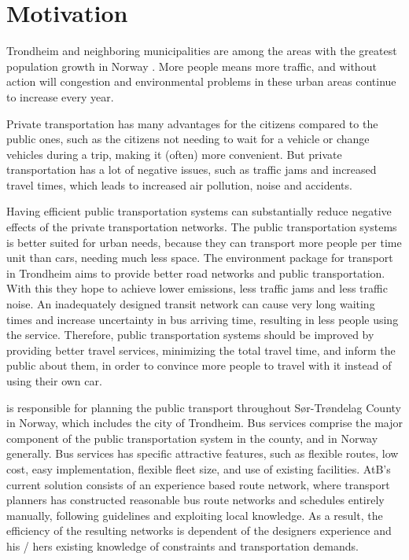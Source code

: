 \section{Motivation} 
\label{sec:motivation}

Trondheim and neighboring municipalities are among the areas with the greatest population growth in Norway \citep{website:miljopakken}. More people means more traffic, and without action will congestion and environmental problems in these urban areas continue to increase every year.

Private transportation has many advantages for the citizens compared to the public ones, such as the citizens not needing to wait for a vehicle or change vehicles during a trip, making it (often) more convenient. But private transportation has a lot of negative issues, such as traffic jams and increased travel times, which leads to increased air pollution, noise and accidents. 

Having efficient public transportation systems can substantially reduce negative effects of the private transportation networks. The public transportation systems is better suited for urban needs, because they can transport more people per time unit than cars, needing much less space. The environment package \citep{website:miljopakken} for transport in Trondheim aims to provide better road networks and public transportation. With this they hope to achieve lower emissions, less traffic jams and less traffic noise. An inadequately designed transit network can cause very long waiting times and increase uncertainty in bus arriving time, resulting in less people using the service. Therefore, public transportation systems should be improved by providing better travel services, minimizing the total travel time, and inform the public about them, in order to convince more people to travel with it instead of using their own car.

\citet{website:atb} is responsible for planning the public transport throughout Sør-Trøndelag County in Norway, which includes the city of Trondheim. Bus services comprise the major component of the public transportation system in the county, and in Norway generally. Bus services has specific attractive features, such as flexible routes, low cost, easy implementation, flexible fleet size, and use of existing facilities. AtB's current solution consists of an experience based route network, where transport planners has constructed reasonable bus route networks and schedules entirely manually, following guidelines and exploiting local knowledge. As a result, the efficiency of the resulting networks is dependent of the designers experience and his / hers existing knowledge of constraints and transportation demands.

